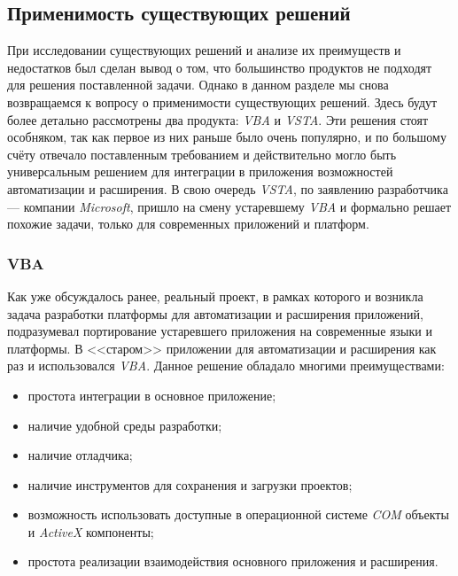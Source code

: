\subsection{Применимость существующих решений}
\label{sec:use_exis_techn}

При исследовании существующих решений и анализе их преимуществ и недостатков был сделан вывод о том, что большинство продуктов не подходят для решения поставленной задачи. Однако в данном разделе мы снова возвращаемся к вопросу о применимости существующих решений. Здесь будут более детально рассмотрены два продукта: {\it VBA} и {\it VSTA}. Эти решения стоят особняком, так как первое из них раньше было очень популярно, и по большому счёту отвечало поставленным требованием и действительно могло быть универсальным решением для интеграции в приложения возможностей автоматизации и расширения. В свою очередь {\it VSTA}, по заявлению разработчика --- компании {\it Microsoft}, пришло на смену устаревшему {\it VBA} и формально решает похожие задачи, только для современных приложений и платформ. 


\subsubsection{VBA}

Как уже обсуждалось ранее, реальный проект, в рамках которого и возникла задача разработки платформы для автоматизации и расширения приложений, подразумевал портирование устаревшего приложения на современные языки и платформы. В <<старом>> приложении для автоматизации и расширения как раз и использовался {\it VBA}. Данное решение обладало многими преимуществами:
\begin{itemize}
\item простота интеграции в основное приложение;
\item наличие удобной среды разработки;
\item наличие отладчика;
\item наличие инструментов для сохранения и загрузки проектов;
\item возможность использовать доступные в операционной системе {\it COM}  объекты и {\it ActiveX} компоненты;
\item простота реализации взаимодействия основного приложения и расширения.
\end{itemize}

